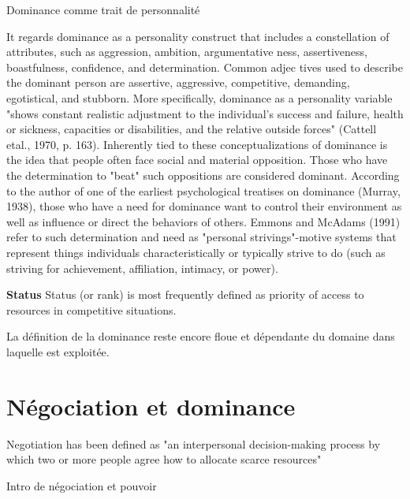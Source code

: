 Dominance comme trait de personnalité


It regards dominance as a personality construct that
includes a constellation of attributes, such as aggression, ambition, argumentative
ness,
assertiveness, boastfulness, confidence, and determination. Common adjec
tives
used to describe the dominant person are assertive, aggressive, competitive,
demanding, egotistical, and stubborn. More specifically, dominance as a personality
variable "shows constant realistic adjustment to the individual's success and failure,
health or sickness, capacities or disabilities, and the relative outside forces" (Cattell
etal., 1970, p. 163). 
Inherently tied to these conceptualizations of dominance is the idea that people
often face social and material opposition. Those who have the determination to
"beat" such oppositions are considered dominant. According to the author of one of
the earliest psychological treatises on dominance (Murray, 1938), those who have a
need for dominance want to control their environment as well as influence or direct
the behaviors of others. Emmons and McAdams (1991) refer to such determination
and need as "personal strivings"-motive systems that represent things individuals
characteristically or typically strive to do (such as striving for achievement, affiliation,
intimacy, or power).


\textbf{Status}
Status (or rank) is most frequently defined as priority of access to resources in
competitive situations.


La définition de la dominance reste encore floue et dépendante du domaine dans laquelle est exploitée. 


\section{Négociation et dominance}
Negotiation has been defined as "an interpersonal
decision-making process by which two or
more people agree how to allocate scarce resources" \cite{thompson2000mind}

Intro de négociation et pouvoir %